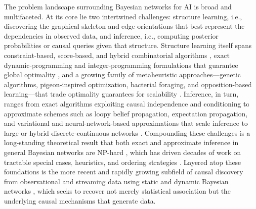 The problem landscape surrounding Bayesian networks for AI is broad and multifaceted. At its core lie two intertwined challenges: structure learning, i.e., discovering the graphical skeleton and edge orientations that best represent the dependencies in observed data, and inference, i.e., computing posterior probabilities or causal queries given that structure. Structure learning itself spans constraint-based, score-based, and hybrid combinatorial algorithms \cite{tsamardinos2006max,kitson2023survey}, exact dynamic-programming and integer-programming formulations that guarantee global optimality \cite{singh2018finding,cussens2017bayesian}, and a growing family of metaheuristic approaches---genetic algorithms, pigeon-inspired optimization, bacterial foraging, and opposition-based learning---that trade optimality guarantees for scalability \cite{kareem2019pigeon,sun2022bayesian,sun2019hybrid,meng2024dynamic,sun2025bayesian,awla2023comparative}. Inference, in turn, ranges from exact algorithms exploiting causal independence and conditioning \cite{zhang1996exploiting,darwiche2013conditioning} to approximate schemes such as loopy belief propagation, expectation propagation, and variational and neural-network-based approximations that scale inference to large or hybrid discrete-continuous networks \cite{murphy2013loopy,minka2013expectation,mnih2014neural,salmeron2018review,heskes2012expectation}. Compounding these challenges is a long-standing theoretical result that both exact and approximate inference in general Bayesian networks are NP-hard \cite{dagum1993approximating}, which has driven decades of work on tractable special cases, heuristics, and ordering strategies \cite{kitson2024impact,trosser2021improved}. Layered atop these foundations is the more recent and rapidly growing subfield of causal discovery from observational and streaming data using static and dynamic Bayesian networks \cite{zhang2026causal,zhang2026causalb,zhang2026dynamic,zhang2026dynamicb}, which seeks to recover not merely statistical association but the underlying causal mechanisms that generate data.

